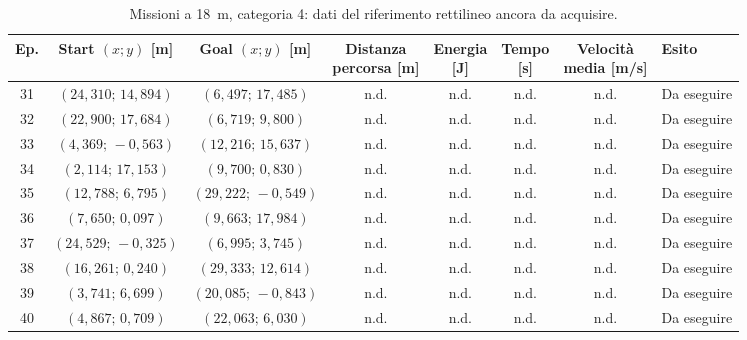 \begin{table}[H]
\centering
\caption{Missioni a 18~m, categoria 4: dati del riferimento rettilineo ancora da acquisire.}
\label{tab:big-map-18m-baseline-cat4}
\begingroup
\fontsize{9}{11}\selectfont
\setlength{\tabcolsep}{2.5pt}
\renewcommand{\arraystretch}{1.2}
\begin{tabular}{@{}c cc cccc l@{}}
\toprule
Ep. & \shortstack{Start $(x;y)$\\{}[m]} & \shortstack{Goal $(x;y)$\\{}[m]} & \shortstack{Distanza\\percorsa [m]} & \shortstack{Energia\\{}[J]} & \shortstack{Tempo\\{}[s]} & \shortstack{Velocità\\media [m/s]} & Esito \\
\midrule
31 & $(24{,}310;\,14{,}894)$ & $(6{,}497;\,17{,}485)$ & n.d. & n.d. & n.d. & n.d. & Da eseguire \\
32 & $(22{,}900;\,17{,}684)$ & $(6{,}719;\,9{,}800)$ & n.d. & n.d. & n.d. & n.d. & Da eseguire \\
33 & $(4{,}369;\,-0{,}563)$ & $(12{,}216;\,15{,}637)$ & n.d. & n.d. & n.d. & n.d. & Da eseguire \\
34 & $(2{,}114;\,17{,}153)$ & $(9{,}700;\,0{,}830)$ & n.d. & n.d. & n.d. & n.d. & Da eseguire \\
35 & $(12{,}788;\,6{,}795)$ & $(29{,}222;\,-0{,}549)$ & n.d. & n.d. & n.d. & n.d. & Da eseguire \\
36 & $(7{,}650;\,0{,}097)$ & $(9{,}663;\,17{,}984)$ & n.d. & n.d. & n.d. & n.d. & Da eseguire \\
37 & $(24{,}529;\,-0{,}325)$ & $(6{,}995;\,3{,}745)$ & n.d. & n.d. & n.d. & n.d. & Da eseguire \\
38 & $(16{,}261;\,0{,}240)$ & $(29{,}333;\,12{,}614)$ & n.d. & n.d. & n.d. & n.d. & Da eseguire \\
39 & $(3{,}741;\,6{,}699)$ & $(20{,}085;\,-0{,}843)$ & n.d. & n.d. & n.d. & n.d. & Da eseguire \\
40 & $(4{,}867;\,0{,}709)$ & $(22{,}063;\,6{,}030)$ & n.d. & n.d. & n.d. & n.d. & Da eseguire \\
\bottomrule
\end{tabular}
\endgroup
\end{table}
